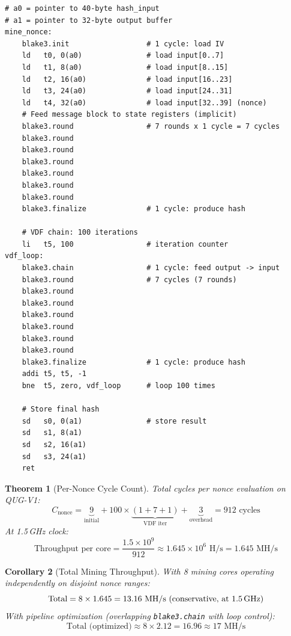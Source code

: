 \documentclass[11pt,a4paper]{article}
\newtheorem{theorem}{Theorem}[section]
\newtheorem{corollary}[theorem]{Corollary}
\begin{document}
\begin{lstlisting}[style=asm,caption={QUG Mining on Xcrypto (RISC-V assembly pseudocode)}]
# a0 = pointer to 40-byte hash_input
# a1 = pointer to 32-byte output buffer
mine_nonce:
    blake3.init                  # 1 cycle: load IV
    ld   t0, 0(a0)               # load input[0..7]
    ld   t1, 8(a0)               # load input[8..15]
    ld   t2, 16(a0)              # load input[16..23]
    ld   t3, 24(a0)              # load input[24..31]
    ld   t4, 32(a0)              # load input[32..39] (nonce)
    # Feed message block to state registers (implicit)
    blake3.round                 # 7 rounds x 1 cycle = 7 cycles
    blake3.round
    blake3.round
    blake3.round
    blake3.round
    blake3.round
    blake3.round
    blake3.finalize              # 1 cycle: produce hash

    # VDF chain: 100 iterations
    li   t5, 100                 # iteration counter
vdf_loop:
    blake3.chain                 # 1 cycle: feed output -> input
    blake3.round                 # 7 cycles (7 rounds)
    blake3.round
    blake3.round
    blake3.round
    blake3.round
    blake3.round
    blake3.round
    blake3.finalize              # 1 cycle: produce hash
    addi t5, t5, -1
    bne  t5, zero, vdf_loop      # loop 100 times

    # Store final hash
    sd   s0, 0(a1)               # store result
    sd   s1, 8(a1)
    sd   s2, 16(a1)
    sd   s3, 24(a1)
    ret
\end{lstlisting}

\begin{theorem}[Per-Nonce Cycle Count]
\label{thm:cycles}
Total cycles per nonce evaluation on QUG-V1:
\begin{equation}
    C_{\text{nonce}} = \underbrace{9}_{\text{initial}} + 100 \times \underbrace{(1 + 7 + 1)}_{\text{VDF iter}} + \underbrace{3}_{\text{overhead}} = 912 \text{ cycles}
\end{equation}
At 1.5\,GHz clock:
\begin{equation}
    \text{Throughput per core} = \frac{1.5 \times 10^9}{912} \approx 1.645 \times 10^6 \text{ H/s} = 1.645 \text{ MH/s}
\end{equation}
\end{theorem}

\begin{corollary}[Total Mining Throughput]
With 8 mining cores operating independently on disjoint nonce ranges:
\begin{equation}
    \text{Total} = 8 \times 1.645 = 13.16 \text{ MH/s (conservative, at 1.5\,GHz)}
\end{equation}
With pipeline optimization (overlapping \texttt{blake3.chain} with loop control):
\begin{equation}
    \text{Total (optimized)} \approx 8 \times 2.12 = 16.96 \approx 17 \text{ MH/s}
\end{equation}
\end{corollary}
\end{document}
